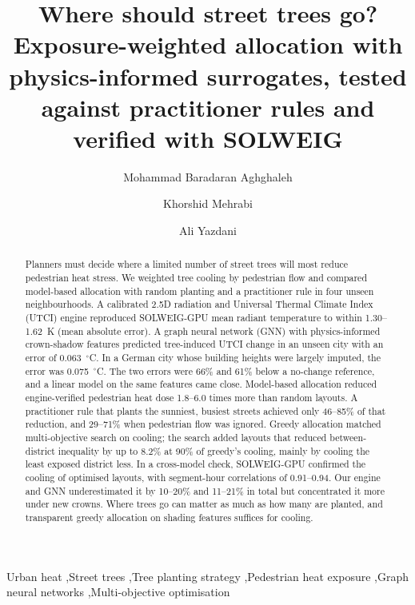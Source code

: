 \documentclass[preprint,12pt,authoryear]{elsarticle}
\newcommand{\degC}{\ensuremath{^\circ}C}
\begin{document}
\begin{frontmatter}

\title{Where should street trees go? Exposure-weighted allocation with physics-informed surrogates, tested against practitioner rules and verified with SOLWEIG}

\author[aff1]{Mohammad Baradaran Aghghaleh}
\author[aff1]{Khorshid Mehrabi}
\author[aff1]{Ali Yazdani}

\begin{abstract}
Planners must decide where a limited number of street trees will most reduce pedestrian heat stress. We weighted tree cooling by pedestrian flow and compared model-based allocation with random planting and a practitioner rule in four unseen neighbourhoods. A calibrated 2.5D radiation and Universal Thermal Climate Index (UTCI) engine reproduced SOLWEIG-GPU mean radiant temperature to within 1.30--1.62~K (mean absolute error). A graph neural network (GNN) with physics-informed crown-shadow features predicted tree-induced UTCI change in an unseen city with an error of 0.063~\degC. In a German city whose building heights were largely imputed, the error was 0.075~\degC. The two errors were 66\% and 61\% below a no-change reference, and a linear model on the same features came close. Model-based allocation reduced engine-verified pedestrian heat dose 1.8--6.0 times more than random layouts. A practitioner rule that plants the sunniest, busiest streets achieved only 46--85\% of that reduction, and 29--71\% when pedestrian flow was ignored. Greedy allocation matched multi-objective search on cooling; the search added layouts that reduced between-district inequality by up to 8.2\% at 90\% of greedy's cooling, mainly by cooling the least exposed district less. In a cross-model check, SOLWEIG-GPU confirmed the cooling of optimised layouts, with segment-hour correlations of 0.91--0.94. Our engine and GNN underestimated it by 10--20\% and 11--21\% in total but concentrated it more under new crowns. Where trees go can matter as much as how many are planted, and transparent greedy allocation on shading features suffices for cooling.
\end{abstract}

\begin{keyword}
Urban heat \sep Street trees \sep Tree planting strategy \sep Pedestrian heat exposure \sep Graph neural networks \sep Multi-objective optimisation
\end{keyword}

\end{frontmatter}
\end{document}
